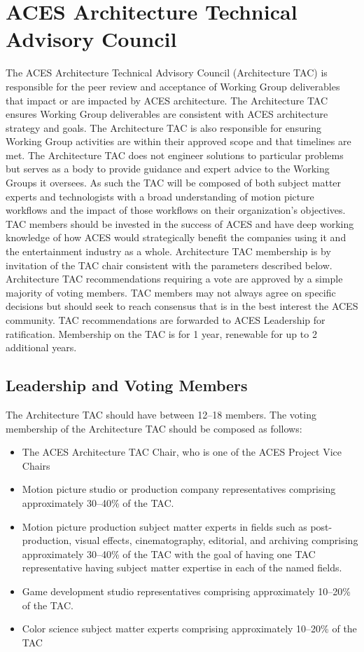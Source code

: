 \newpage
\section{ACES Architecture Technical Advisory Council}
The ACES Architecture Technical Advisory Council (Architecture TAC) is responsible for the peer review and acceptance of Working Group deliverables that impact or are impacted by ACES architecture. The Architecture TAC ensures Working Group deliverables are consistent with ACES architecture strategy and goals. The Architecture TAC is also responsible for ensuring Working Group activities are within their approved scope and that timelines are met. The Architecture TAC does not engineer solutions to particular problems but serves as a body to provide guidance 
and expert advice to the Working Groups it oversees. As such the TAC will be composed of both subject matter experts and technologists with a broad understanding of motion picture workflows and the impact of those workflows on their organization's objectives.  TAC members should be invested in the success of ACES and have deep working knowledge of how ACES would strategically benefit the companies using it and the entertainment industry as a whole.  Architecture TAC membership is by invitation of the TAC chair consistent with the parameters described below. Architecture TAC recommendations requiring a vote are approved by a simple majority of voting members. TAC members may not always agree on specific decisions but should seek to reach consensus that is in the best interest the ACES community. TAC recommendations are forwarded to ACES Leadership for ratification.  Membership on the TAC is for 1 year, renewable for up to 2 additional years.

\subsection{Leadership and Voting Members}
The Architecture TAC should have between 12--18 members.  The voting membership of the Architecture TAC should be composed as follows:

\begin{itemize}
    \item The ACES Architecture TAC Chair, who is one of the ACES Project Vice Chairs
    \item Motion picture studio or production company representatives comprising approximately 30--40\% of the TAC.
    \item Motion picture production subject matter experts in fields such as post-production, visual effects, cinematography, editorial, and archiving comprising approximately 30--40\% of the TAC with the goal of having one TAC representative having subject matter expertise in each of the named fields.
    \item Game development studio representatives comprising approximately 10--20\% of the TAC.
    \item Color science subject matter experts comprising approximately 10--20\% of the TAC
\end{itemize}

